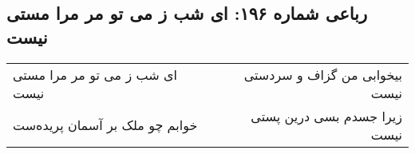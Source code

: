 \begin{center}
\section*{رباعی شماره ۱۹۶: ای شب ز می تو مر مرا مستی نیست}
\label{sec:0196}
\begin{longtable}{l p{0.5cm} r}
ای شب ز می تو مر مرا مستی نیست
&&
بیخوابی من گزاف و سردستی نیست
\\
خوابم چو ملک بر آسمان پریده‌ست
&&
زیرا جسدم بسی درین پستی نیست
\\
\end{longtable}
\end{center}
